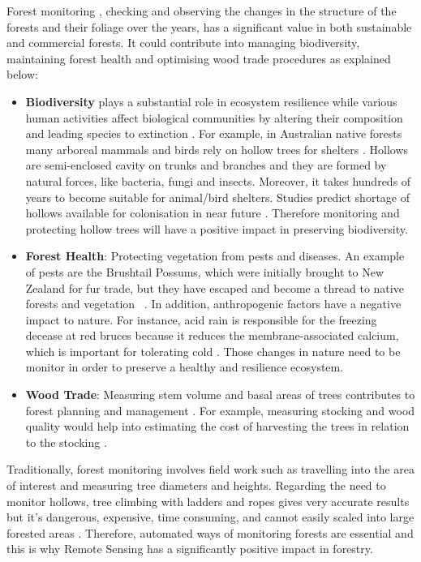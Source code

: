 \documentclass{subfiles}
\begin{document}
Forest monitoring {\color{blue}, checking and observing the changes in the structure of the forests and their foliage over the years,} has a significant value in both sustainable and commercial forests{\color{blue}. It} could contribute into managing biodiversity, maintaining forest health and optimising wood trade procedures as explained below: 
\begin{itemize}
 \item \textbf{Biodiversity} plays a substantial role in ecosystem resilience \cite{Elmqvist2003} while various human activities affect biological communities by altering their composition and leading species to extinction \cite{Hooper2005}.  For example, in Australian native forests many arboreal mammals and birds rely on hollow trees for shelters \cite{Lindenmayer2010} {\color{blue}. Hollows are semi-enclosed cavity on trunks and branches and they are formed by natural forces, like bacteria, fungi and insects. Moreover, it takes hundreds of years to become suitable for animal/bird shelters. Studies} predict shortage of hollows available for colonisation in near future \cite{Goldingay2009}\cite{Gibbons2002}. Therefore monitoring  and protecting hollow trees will have a positive impact in preserving biodiversity.
 \item \textbf{Forest Health}: Protecting vegetation from pests and diseases. An example of pests are the Brushtail Possums, which were initially brought to New Zealand for fur trade, but they have escaped and become a thread to native forests and vegetation ~\cite{DepartementOfConversation2014}. In addition, anthropogenic factors have a negative impact to nature. For instance, acid rain is responsible for the freezing decease at red bruces because it reduces the membrane-associated calcium, which is important for tolerating cold 
 \cite{DeHayes1999}. Those changes in nature need to be monitor in order to preserve a healthy and resilience ecosystem. 

 
 \item \textbf{Wood Trade}:  Measuring stem volume and basal areas of trees contributes to forest planning and management \cite{Holmgren2004}. For example, measuring stocking and wood quality would help into estimating the cost of harvesting the trees in relation to the stocking \cite{Susana2015}.
 
\end{itemize}
 
{\color{blue}Traditionally, forest monitoring involves field work such as travelling into the area of interest and measuring tree diameters and heights. Regarding the need to monitor hollows}, tree climbing with ladders and ropes gives very accurate results but it's dangerous, expensive, time consuming, and cannot easily scaled into large forested areas \cite{Harper2004}\cite{Rayner2011}. Therefore, automated ways of monitoring forests are essential and this is why Remote Sensing has a significantly positive impact in forestry. 
 
\end{document}
